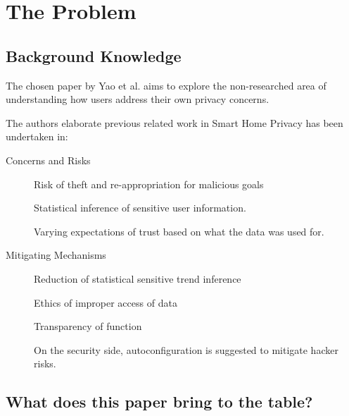 \section{The Problem}

\subsection{Background Knowledge}

The chosen paper by Yao et al. \parencite*{Yao:2019:DMC:3290605.3300428} aims to explore the non-researched area of understanding how users address their own privacy concerns.

The authors elaborate previous related work in Smart Home Privacy has been undertaken in:
\begin{description}
	\item [Concerns and Risks] 
	
	Risk of theft and re-appropriation for malicious goals
	
	Statistical inference of sensitive user information.
	
	Varying expectations of trust based on what the data was used for.
	
	\item [Mitigating Mechanisms]
	
	Reduction of statistical sensitive trend inference
	
	Ethics of improper access of data
	
	Transparency of function 
	
	On the security side, autoconfiguration is suggested to mitigate hacker risks.
\end{description}




\subsection{What does this paper bring to the table?}


